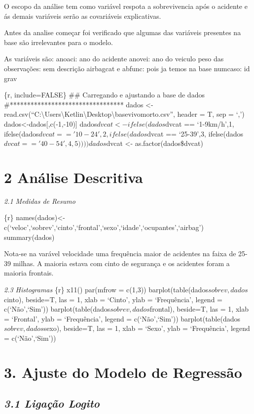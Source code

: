 \documentclass[]{article}
\begin{document}
O escopo da análise tem como variável respota a sobrevivencia após o
acidente e ás demais variáveis serão as covariáveis explicativas.

Antes da analise começar foi verificado que algumas das variáveis
presentes na base são irrelevantes para o modelo.

As variáveis são: anoaci: ano do acidente anovei: ano do veiculo peso
das observações: sem descrição airbagcat e abfunc: pois ja temos na base
numcaso: id grav

\{r, include=FALSE\} \#\# Carregando e ajustando a base de dados
\#********************************* dados \textless{}-
read.csv(``C:\textbackslash{}Users\textbackslash{}Ketlin\textbackslash{}Desktop\textbackslash{}basevivomorto.csv'',
header = T, sep = `,') dados\textless{}-dados{[},c(-1,-10){]}
dados\(dvcat <- ifelse(dados\)dvcat == `1-9km/h',1,
ifelse(dados\(dvcat == '10-24',2,  ifelse(dados\)dvcat == `25-39',3,
ifelse(dados\(dvcat == '40-54',4,5)))) dados\)dvcat \textless{}-
as.factor(dados\$dvcat)

\section{2 Análise Descritiva}\label{analise-descritiva}

\emph{2.1 Medidas de Resumo}

\{r\}
names(dados)\textless{}-c(`veloc',`sobrev',`cinto',`frontal',`sexo',`idade',`ocupantes',`airbag')
summary(dados)

Nota-se na varável velocidade uma frequência maior de acidentes na faixa
de 25-39 milhas. A maioria estava com cinto de segurança e os acidentes
foram a maioria frontais.

\emph{2.3 Histogramas} \{r\} x11() par(mfrow = c(1,3))
barplot(table(dados\(sobrev,dados\)cinto), beside=T, las = 1, xlab =
`Cinto', ylab = `Frequência', legend = c(`Não',`Sim'))
barplot(table(dados\(sobrev,dados\)frontal), beside=T, las = 1, xlab =
`Frontal', ylab = `Frequência', legend = c(`Não',`Sim'))
barplot(table(dados\(sobrev,dados\)sexo), beside=T, las = 1, xlab =
`Sexo', ylab = `Frequência', legend = c(`Não',`Sim'))

\section{3. Ajuste do Modelo de
Regressão}\label{ajuste-do-modelo-de-regressao}

\subsection{\texorpdfstring{\emph{3.1 Ligação
Logito}}{3.1 Ligação Logito}}\label{ligacao-logito}
\end{document}
